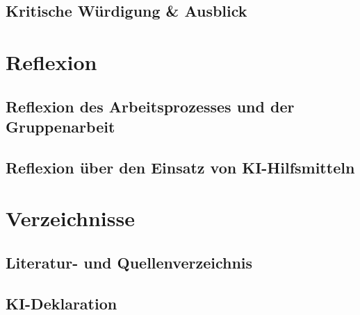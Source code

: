 \documentclass[10pt, a4paper]{article}
\begin{document}
\subsection{Kritische Würdigung \& Ausblick}

\section{Reflexion}
\subsection{Reflexion des Arbeitsprozesses und der Gruppenarbeit}
\subsection{Reflexion über den Einsatz von KI-Hilfsmitteln}

\newpage
\section{Verzeichnisse}
\subsection{Literatur- und Quellenverzeichnis}
\printbibliography[heading=none]

\subsection{KI-Deklaration}
\end{document}
